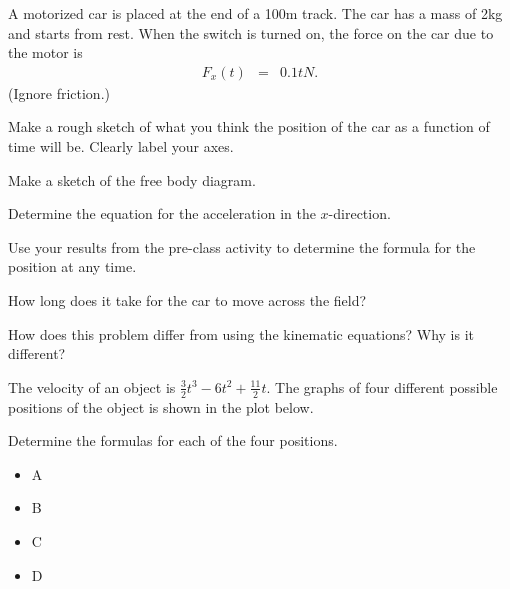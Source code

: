 \begin{problem}

\item A motorized car is placed at the end of a 100m track. The car
  has a mass of 2kg and starts from rest. When the switch is turned
  on, the force on the car due to the motor is
  \begin{eqnarray*}
    F_x(t) & = & 0.1 t N.
  \end{eqnarray*}
  (Ignore friction.)
  \begin{subproblem}
    \item Make a rough sketch of what you think the position of the car
      as a function of time will be. Clearly label your axes.
      
      \vfill
      
    \item Make a sketch of the free body diagram.
      \vspace{7em}
    \item Determine the equation for the acceleration in the $x$-direction.
      \vspace{5em}
      \clearpage
    \item Use your results from the pre-class activity to
          determine the formula for the position at any time.
      \vfill
      \vfill
    \item How long does it take for the car to move across the field?
      \vfill

    \item How does this problem differ from using the kinematic
      equations? Why is it different?

      \vfill

  \end{subproblem}

  \clearpage

\item The velocity of an object is
  $\frac{3}{2}t^3-6t^2+\frac{11}{2}t$. The graphs of four different
  possible positions of the object is shown in the plot below. \\
  \scalebox{0.6}{}
  \begin{subproblem}
    \item Determine the formulas for each of the four positions.
      \begin{itemize}
      \item A
        \vfill
      \item B
        \vfill
      \item C
        \vfill
      \item D
        \vfill
      \end{itemize}
  \end{subproblem}


\end{problem}
